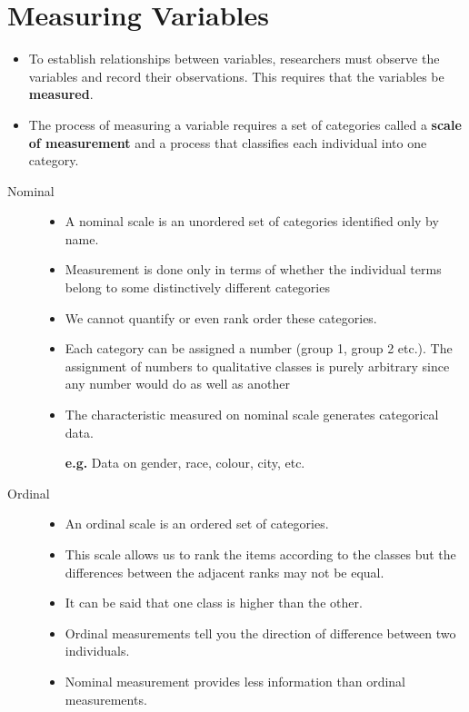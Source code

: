 \documentclass[
10pt, %
a4paper, %
]{report}
\begin{document}
\section*{Measuring Variables}
\begin{itemize}
\item To establish relationships between variables, researchers must observe the variables and record their observations. This requires that the variables be \textbf{measured}.
\item The process of measuring a variable requires a set of categories called a \textbf{scale of measurement} and a process that classifies each individual into one category.
\end{itemize}

\begin{description}
\item[Nominal]
\begin{itemize}
\item[]
\item A nominal scale is an unordered set of categories identified only by name.
\item Measurement is done only in terms of whether the individual terms belong to some distinctively different categories
\item We cannot quantify or even rank order these categories.
\item Each category can be assigned a number (group 1, group 2 etc.). The assignment of numbers to qualitative classes is purely arbitrary since any number would do as well as another
\item The characteristic measured on nominal scale generates categorical data.
\item[\textbf{e.g.}] Data on gender, race, colour, city, etc.
\end{itemize}
\item[Ordinal]
\begin{itemize}
\item[]
\item An ordinal scale is an ordered set of categories.
\item This scale allows us to rank the items according to the classes but the differences between the adjacent ranks may not be equal.
\item It can be said that one class is higher than the other.
\item Ordinal measurements tell you the direction of difference between two individuals.
\item Nominal measurement provides less information than ordinal measurements.

\end{itemize}
\end{description}
\end{document}
